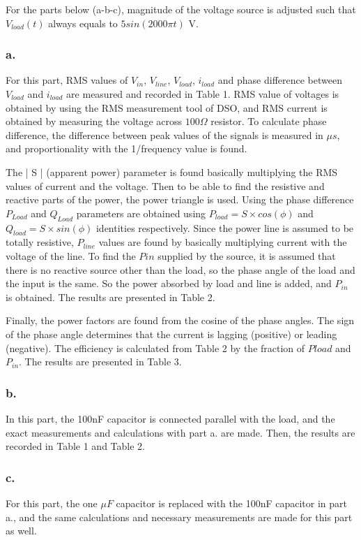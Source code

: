 \documentclass[letterpaper,12pt]{article}
\begin{document}
For the parts below (a-b-c), magnitude of the voltage source is adjusted such that \(V_{load}(t)\) always equals to \(5sin(2000\pi t)\) V. 

\subsubsection{a.}
For this part, RMS values of \(V_{in}\), \(V_{line}\), \(V_{load}\), \(i_{load}\) and phase difference between \(V_{load}\) and \(i_{load}\) are measured and recorded in Table 1. RMS value of voltages is obtained by using the RMS measurement tool of DSO, and RMS current is obtained by measuring the voltage across \(100\Omega\) resistor. To calculate phase difference, the difference between peak values of the signals is measured in \(\mu s\), and proportionality with the 1/frequency value is found.

\vspace{2mm}
The | S |  (apparent power) parameter is found basically multiplying the RMS values of current and the voltage. Then to be able to find the resistive and reactive parts of the power, the power triangle is used. Using the phase difference $P_{Load}$ and $Q_{Load}$ parameters are obtained using $P_{load} = S\times cos(\phi)$ and $Q_{load} = S\times sin(\phi)$ identities respectively. Since the power line is assumed to be totally resistive, $P_{line}$ values are found by basically multiplying current with the voltage of the line. To find the $P{in}$ supplied by the source, it is assumed that there is no reactive source other than the load, so the phase angle of the load and the input is the same. So the power absorbed by load and line is added, and $P_{in}$ is obtained. The results are presented in Table 2.

\vspace{2mm}
Finally, the power factors are found from the cosine of the phase angles. The sign of the phase angle determines that the current is lagging (positive) or leading (negative). The efficiency is calculated from Table 2 by the fraction of $P{load}$ and $P_{in}$. The results are presented in Table 3.
\subsubsection{b.}
In this part, the 100nF capacitor is connected parallel with the load, and the exact measurements and calculations with part a. are made. Then, the results are recorded in Table 1 and Table 2.   
\subsubsection{c.}
For this part, the one \(\mu F\) capacitor is replaced with the 100nF capacitor in part a., and the same calculations and necessary measurements are made for this part as well.
\end{document}
